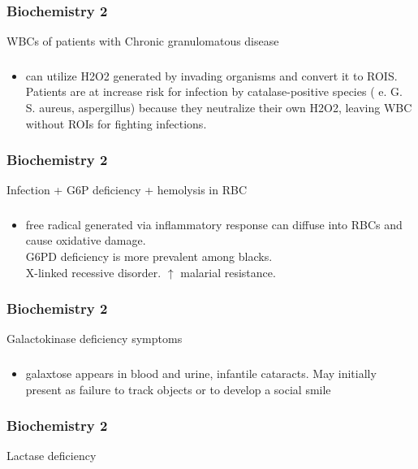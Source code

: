 \documentclass[11pt]{beamer}
\begin{document}
\begin{frame}
 \frametitle{Biochemistry 2}
WBCs of  patients with Chronic granulomatous disease
\end{frame}

\begin{frame}
 \frametitle{}
\begin{itemize}
\item can utilize H2O2 generated by invading organisms and convert it to ROIS. Patients are at increase risk for infection by catalase-positive species ( e. G. S. aureus, aspergillus) because they neutralize their own H2O2, leaving  WBC without ROIs for fighting infections. 
\end{itemize}
\end{frame}

\begin{frame}
 \frametitle{Biochemistry 2}
Infection + G6P deficiency + hemolysis in RBC
\end{frame}

\begin{frame}
 \frametitle{}
\begin{itemize}
\item free radical generated via inflammatory response can diffuse into RBCs and cause oxidative damage.  \\ G6PD deficiency is more prevalent among blacks. \\ X-linked recessive disorder. ${\uparrow}$ malarial resistance.
\end{itemize}
\end{frame}

\begin{frame}
 \frametitle{Biochemistry 2}
Galactokinase deficiency symptoms 
\end{frame}

\begin{frame}
 \frametitle{}
\begin{itemize}
\item galaxtose appears in blood and urine, infantile cataracts. May initially present as failure to track objects or to develop a social smile
\end{itemize}
\end{frame}

\begin{frame}
 \frametitle{Biochemistry 2}
Lactase deficiency
\end{frame}
\end{document}
